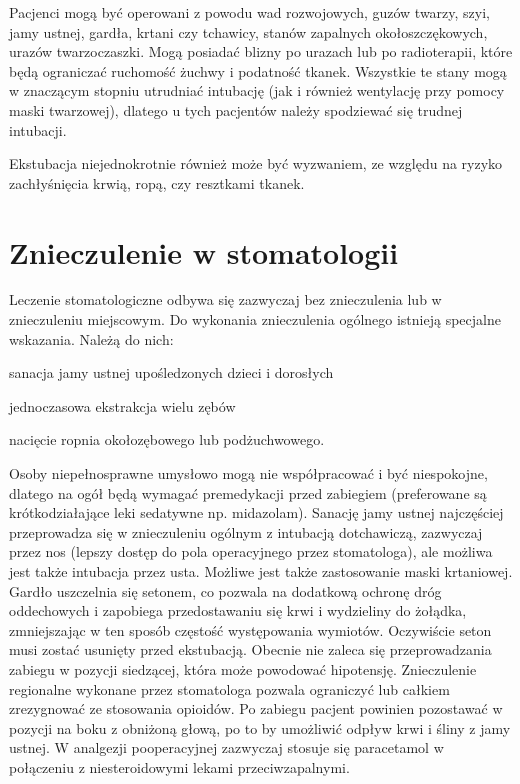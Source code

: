 \documentclass[a4paper, 12pt]{report}
\begin{document}
Pacjenci mogą być operowani z powodu wad rozwojowych, guzów twarzy,
szyi, jamy ustnej, gardła, krtani czy tchawicy, stanów zapalnych
okołoszczękowych, urazów twarzoczaszki. Mogą posiadać blizny po
urazach lub po radioterapii, które będą ograniczać ruchomość żuchwy i
podatność tkanek. Wszystkie te stany mogą w znaczącym stopniu
utrudniać intubację (jak i również wentylację przy pomocy maski
twarzowej), dlatego u tych pacjentów należy spodziewać się trudnej
intubacji.

Ekstubacja niejednokrotnie również może być wyzwaniem, ze względu na
ryzyko zachłyśnięcia krwią, ropą, czy resztkami tkanek.

\chapter{Znieczulenie w stomatologii}

Leczenie stomatologiczne odbywa się zazwyczaj bez znieczulenia lub w
znieczuleniu miejscowym. Do wykonania znieczulenia ogólnego istnieją
specjalne wskazania. Należą do nich: 
\begin{inparaenum}
\item sanacja jamy ustnej upośledzonych dzieci i dorosłych
\item jednoczasowa ekstrakcja wielu zębów
\item nacięcie ropnia okołozębowego lub podżuchwowego.
\end{inparaenum}

Osoby niepełnosprawne umysłowo mogą nie współpracować i być
niespokojne, dlatego na ogół będą wymagać premedykacji przed zabiegiem
(preferowane są krótkodziałające leki sedatywne
np. midazolam). Sanację jamy ustnej najczęściej przeprowadza się w
znieczuleniu ogólnym z intubacją dotchawiczą, zazwyczaj przez nos
(lepszy dostęp do pola operacyjnego przez stomatologa), ale możliwa
jest także intubacja przez usta. Możliwe jest także zastosowanie maski
krtaniowej. Gardło uszczelnia się setonem, co pozwala na dodatkową
ochronę dróg oddechowych i zapobiega przedostawaniu się krwi i
wydzieliny do żołądka, zmniejszając w ten sposób częstość występowania
wymiotów. Oczywiście seton musi zostać usunięty przed
ekstubacją. Obecnie nie zaleca się przeprowadzania zabiegu w pozycji
siedzącej, która może powodować hipotensję. Znieczulenie regionalne
wykonane przez stomatologa pozwala ograniczyć lub całkiem zrezygnować
ze stosowania opioidów. Po zabiegu pacjent powinien pozostawać w
pozycji na boku z obniżoną głową, po to by umożliwić odpływ krwi i
śliny z jamy ustnej. W analgezji pooperacyjnej zazwyczaj stosuje się
paracetamol w połączeniu z niesteroidowymi lekami przeciwzapalnymi. 
\end{document}
